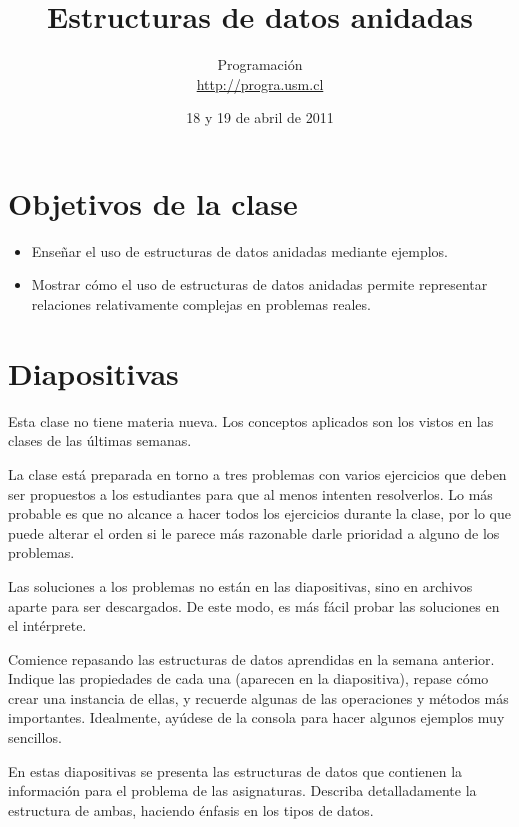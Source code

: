 \documentclass[10pt]{article}
\title{Estructuras de datos anidadas}
\author{Programación \\ \url{http://progra.usm.cl}}
\date{18 y 19 de abril de 2011}
\begin{document}
  \maketitle

  \section*{Objetivos de la clase}
  \begin{itemize}
    \item Enseñar el uso de estructuras de datos anidadas mediante ejemplos.
    \item Mostrar cómo el uso de estructuras de datos anidadas
      permite representar relaciones relativamente complejas en problemas reales.
  \end{itemize}

  \section*{Diapositivas}

  Esta clase no tiene materia nueva.
  Los conceptos aplicados son los vistos en las clases de las últimas semanas.

  La clase está preparada en torno a tres problemas con varios ejercicios
  que deben ser propuestos a los estudiantes para que al menos intenten resolverlos.
  Lo más probable es que no alcance a hacer todos los ejercicios durante la clase,
  por lo que puede alterar el orden si le parece más razonable
  darle prioridad a alguno de los problemas.

  Las soluciones a los problemas no están en las diapositivas,
  sino en archivos aparte para ser descargados.
  De este modo, es más fácil probar las soluciones en el intérprete.


  Comience repasando las estructuras de datos aprendidas en la semana anterior.
  Indique las propiedades de cada una (aparecen en la diapositiva),
  repase cómo crear una instancia de ellas,
  y recuerde algunas de las operaciones y métodos más importantes.
  Idealmente, ayúdese de la consola para hacer algunos ejemplos muy sencillos.


  En estas diapositivas se presenta las estructuras de datos
  que contienen la información para el problema de las asignaturas.
  Describa detalladamente la estructura de ambas,
  haciendo énfasis en los tipos de datos.
\end{document}
